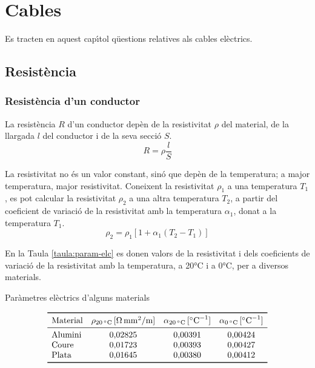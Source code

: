 \chapter{Cables}

Es tracten en aquest cap\'{\i}tol q\"{u}estions relatives als cables el\`{e}ctrics.

\section{Resist\`{e}ncia}

\subsection{Resist\`{e}ncia d'un conductor}

La resist\`{e}ncia $R$ d'un conductor dep\`{e}n de la resistivitat $\rho$
del material, de la llargada $l$ del conductor i de la seva secci\'{o}
$S$.
\begin{equation}
   R= \rho \frac{l}{S}
\end{equation}
\index{$\rho$}

La resistivitat no
\'{e}s un valor constant, sin\'{o} que dep\`{e}n de la temperatura; a major
temperatura, major resistivitat. Coneixent la resistivitat $\rho_1$ a una
temperatura $T_1$, es pot calcular la resistivitat $\rho_2$ a una altra
temperatura $T_2$, a partir del coeficient de variaci\'{o} de la
resistivitat amb la temperatura $\alpha_1$, donat a la temperatura $T_1$.
\begin{equation}
   \rho_2 = \rho_1 [1 + \alpha_1 (T_2 - T_1)]\label{eq:resistivitat}
\end{equation}
\index{$\alpha$}

En la Taula
\vref{taula:param-elc} es donen valors de la resistivitat i dels
coeficients de variaci\'{o} de la resistivitat amb la temperatura, a
20\unit{\celsius} i a 0\unit{\celsius}, per a diversos materials.
\begin{table}[htb]
   \caption{\label{taula:param-elc} Par\`{a}metres el\`{e}ctrics d'alguns materials}
   \[ \begin{array}{lccc}
   \toprule[1pt]
   \text{Material} & \rho_{20\unit{\celsius}}\unit{[\ohm\,mm^2/m]} & \alpha_{20\unit{\celsius}}\unit{[\celsius^{-1}]} &
   \alpha_{0\unit{\celsius}}\unit{[\celsius^{-1}]}
   \\
   \midrule
      \text{Alumini} & 0{,}02825 & 0{,}00391 & 0{,}00424 \\
      \text{Coure}   & 0{,}01723 & 0{,}00393 & 0{,}00427 \\
      \text{Plata}   & 0{,}01645 & 0{,}00380 & 0{,}00412 \\
   \bottomrule[1pt]
   \end{array}   \]
\end{table}

